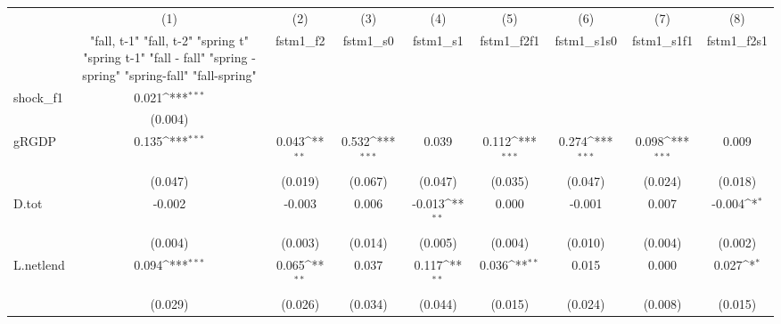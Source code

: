 {
\def\sym#1{\ifmmode^{#1}\else\(^{#1}\)\fi}
\begin{tabular}{l*{8}{c}}
\toprule
            &\multicolumn{1}{c}{(1)}&\multicolumn{1}{c}{(2)}&\multicolumn{1}{c}{(3)}&\multicolumn{1}{c}{(4)}&\multicolumn{1}{c}{(5)}&\multicolumn{1}{c}{(6)}&\multicolumn{1}{c}{(7)}&\multicolumn{1}{c}{(8)}\\
            &\multicolumn{1}{c}{  "fall, t-1" "fall, t-2" "spring t" "spring t-1"  "fall - fall" "spring - spring" "spring-fall" "fall-spring" }&\multicolumn{1}{c}{fstm1\_f2}&\multicolumn{1}{c}{fstm1\_s0}&\multicolumn{1}{c}{fstm1\_s1}&\multicolumn{1}{c}{fstm1\_f2f1}&\multicolumn{1}{c}{fstm1\_s1s0}&\multicolumn{1}{c}{fstm1\_s1f1}&\multicolumn{1}{c}{fstm1\_f2s1}\\
\midrule
shock\_f1    &       0.021\sym{***}&                     &                     &                     &                     &                     &                     &                     \\
            &     (0.004)         &                     &                     &                     &                     &                     &                     &                     \\
\addlinespace
gRGDP       &       0.135\sym{***}&       0.043\sym{**} &       0.532\sym{***}&       0.039         &       0.112\sym{***}&       0.274\sym{***}&       0.098\sym{***}&       0.009         \\
            &     (0.047)         &     (0.019)         &     (0.067)         &     (0.047)         &     (0.035)         &     (0.047)         &     (0.024)         &     (0.018)         \\
\addlinespace
D.tot       &      -0.002         &      -0.003         &       0.006         &      -0.013\sym{**} &       0.000         &      -0.001         &       0.007         &      -0.004\sym{*}  \\
            &     (0.004)         &     (0.003)         &     (0.014)         &     (0.005)         &     (0.004)         &     (0.010)         &     (0.004)         &     (0.002)         \\
\addlinespace
L.netlend   &       0.094\sym{***}&       0.065\sym{**} &       0.037         &       0.117\sym{**} &       0.036\sym{**} &       0.015         &       0.000         &       0.027\sym{*}  \\
            &     (0.029)         &     (0.026)         &     (0.034)         &     (0.044)         &     (0.015)         &     (0.024)         &     (0.008)         &     (0.015)         \\

\end{tabular}}
